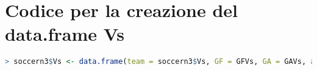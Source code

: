 \section{Codice per la creazione del data.frame Vs} \label{sec:a3}
\begin{lstlisting}[language=R]
	> soccern3$Vs <- data.frame(team = soccern3$Vs, GF = GFVs, GA = GAVs, at.home = 0, Poss = PossVs, Sh = ShVs, SoT = ShTVs, G.Sh = G.ShVs, PAtt = PAttVs, PCmp. = PCmp.Vs, SPAtt = SPAttVs, SPCmp. = SPCmp.Vs, MPAtt = MPAttVs, MPCmp. = MPCmp.Vs, LPAtt = LPAttVs, LPCmp. = LPCmp.Vs, ToDef3rd = ToDef3rdVs, ToAtt3rd = ToAtt3rdVs, ToAttPen = ToAttPenVs, TotDist = ToDistVs, Fls = FlsVs, Fld = FldVs, Crs = CrsVs, Int = IntVs, TklWin = TklWinVs, Recov = RecovVs)
\end{lstlisting}

